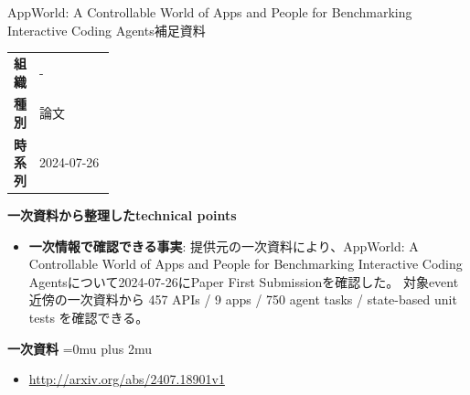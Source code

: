 \begin{technicalnote}{AppWorld: A Controllable World of Apps and People for Benchmarking Interactive Coding Agents}{補足資料}
\begingroup
\begin{tabularx}{\linewidth}{@{}>{\bfseries}p{0.22\linewidth}X@{}}
組織 & - \\
種別 & 論文 \\
時系列 & 2024-07-26 \\
\end{tabularx}
\smallskip
{\bfseries 一次資料から整理したtechnical points}
\begin{itemize}[leftmargin=1.5em,itemsep=0.35em]
\item \textbf{一次情報で確認できる事実}: 提供元の一次資料により、AppWorld: A Controllable World of Apps and People for Benchmarking Interactive Coding Agentsについて2024-07-26にPaper First Submissionを確認した。 対象event近傍の一次資料から 457 APIs / 9 apps / 750 agent tasks / state-based unit tests を確認できる。
\end{itemize}
\begin{minipage}{\linewidth}
\begin{samepage}
{\bfseries 一次資料}
\begingroup\sloppy
\Urlmuskip=0mu plus 2mu\relax
\begin{itemize}[leftmargin=1.5em,itemsep=0.25em]
\item {\scriptsize\url{http://arxiv.org/abs/2407.18901v1}}
\end{itemize}
\endgroup
\end{samepage}
\end{minipage}
\endgroup
\end{technicalnote}
\medskip

